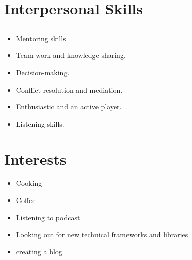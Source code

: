 \documentclass[letterpaper]{twentysecondcv} %
\begin{document}
\makesecondpage %


\section{Interpersonal Skills}

\subsection{}{
	\begin{itemize}
		\item Mentoring skills 
		\item Team work and knowledge-sharing.
		\item Decision-making.
		\item Conflict resolution and mediation.
		\item Enthusiastic and an active player.
		\item Listening skills.
	\end{itemize}
}

\section{Interests}
\begin{itemize}
	\item Cooking
	\item Coffee
	\item Listening to podcast
	\item Looking out for new technical frameworks and libraries
	\item creating a blog
\end{itemize}



\end{document}
